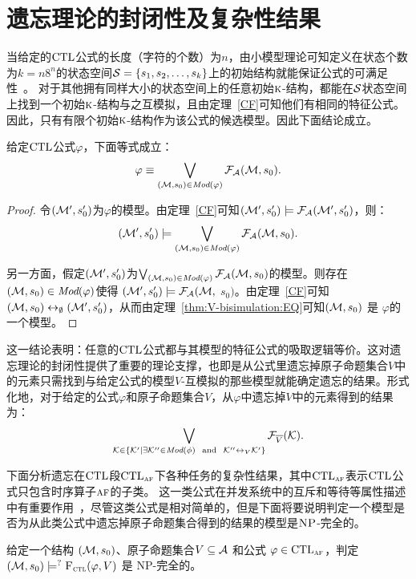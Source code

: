 \section{遗忘理论的封闭性及复杂性结果}
当给定的$\textrm{CTL}$公式的长度（字符的个数）为$n$，由小模型理论可知定义在状态个数为$k=n8^n$的状态空间${\cal S}=\{s_1,s_2,\dots, s_k\}$上的初始结构就能保证公式的可满足性~\cite{DBLP:journals/jcss/EmersonH85}。
对于其他拥有同样大小的状态空间上的任意初始$\textsc{k}$-结构，都能在${\cal S}$状态空间上找到一个初始$\textsc{k}$-结构与之互模拟，且由定理~\ref{CF}可知他们有相同的特征公式。
因此，只有有限个初始$\textsc{k}$-结构作为该公式的候选模型。因此下面结论成立。

\begin{lemma}\label{lem:models:formula}
	给定$\textrm{CTL}$公式$\varphi$，下面等式成立：
	\begin{equation*}
		\varphi\equiv \bigvee_{({\cal M}, s_0)\in\textit{Mod}(\varphi)}{\cal F}_{\cal A}({\cal M}, s_0).
	\end{equation*}
\end{lemma}
\begin{proof}
	令$({\cal M}', s_0')$为$\varphi$的模型。由定理~\ref{CF}可知$({\cal M}', s_0') \models {\cal F}_{{\cal A}}({\cal M}', s_0')$，则：
	$$({\cal M}', s_0') \models \bigvee_{({\cal M}, s_0)\in \textit{Mod}(\varphi)} {\cal F}_{{\cal A}}({\cal M}, s_0).$$
	
	另一方面，假定$({\cal M}', s_0')$为$\bigvee_{({\cal M}, s_0)\in \textit{Mod}(\varphi)} {\cal F}_{{\cal A}}({\cal M}, s_0)$的模型。则存在$({\cal M}, s_0)\in \textit{Mod}(\varphi)$使得 $({\cal M}', s_0') \models {\cal F}_{{\cal A}}({\cal M},$ $s_0)$。由定理~\ref{CF}可知$({\cal M}, s_0) \leftrightarrow_{\emptyset} ({\cal M}', s_0')$，从而由定理~\ref{thm:V-bisimulation:EQ}可知$({\cal M}, s_0)$ 是 $\varphi$的一个模型。
\end{proof}

这一结论表明：任意的$\textrm{CTL}$公式都与其模型的特征公式的吸取逻辑等价。这对遗忘理论的封闭性提供了重要的理论支撑，也即是从公式里遗忘掉原子命题集合$V$中的元素只需找到与给定公式的模型$V$-互模拟的那些模型就能确定遗忘的结果。形式化地，对于给定的公式$\varphi$和原子命题集合$V$，从$\varphi$中遗忘掉$V$中的元素得到的结果为：
\begin{equation*}
	\bigvee_{{\cal K}\in  \{{\cal K}'\mid \exists {\cal K}''\in\textit{Mod}(\phi)\ \text{ and }\ {\cal K}''\leftrightarrow_V{\cal K}'\}} {\cal F}_{\overline V}({\cal K}).
\end{equation*}


下面分析遗忘在$\textrm{CTL}$段$\textrm{CTL}_{\textsc{a}\textsc{f}}$下各种任务的复杂性结果，其中$\textrm{CTL}_{\textsc{a}\textsc{f}}$表示$\textrm{CTL}$公式只包含时序算子$\textsc{a} \textsc{f}$的子类。
这一类公式在并发系统中的互斥和等待等属性描述中有重要作用~\cite{Baier:PMC:2008}，尽管这类公式是相对简单的，但是下面将要说明判定一个模型是否为从此类公式中遗忘掉原子命题集合得到的结果的模型是$\textsc{NP}$-完全的。
\begin{proposition}[模型检测]
	\label{modelChecking}
	给定一个结构 $({\cal M},s_0)$、原子命题集合$V\subseteq{\cal A}$ 和公式 $\varphi \in \textrm{CTL}_{\textsc{a}\textsc{f}}$，判定 $({\cal M},s_0) \models^? {\textsc{F}_{\textsc{ctl}}}(\varphi, V)$ 是 \textsc{NP}-完全的。
\end{proposition}

